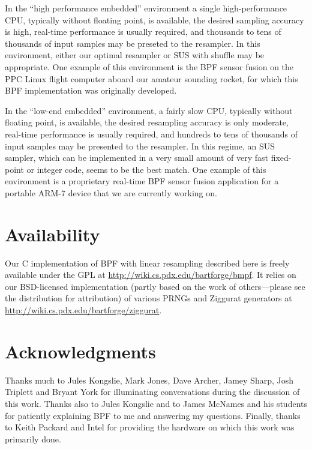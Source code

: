 \documentclass[12pt]{article}
\begin{document}
  In the ``high performance embedded'' environment a single
  high-performance CPU, typically without floating point, is
  available, the desired sampling accuracy is high,
  real-time performance is usually required, and thousands
  to tens of thousands of input samples may be preseted to
  the resampler.  In this environment, either our optimal
  resampler or SUS with shuffle may be appropriate.  One
  example of this environment is the BPF sensor fusion on
  the PPC Linux flight computer aboard our amateur sounding
  rocket, for which this BPF implementation was originally
  developed.

  In the ``low-end embedded'' environment, a fairly slow
  CPU, typically without floating point, is available, the
  desired resampling accuracy is only moderate, real-time
  performance is usually required, and hundreds to tens of
  thousands of input samples may be presented to the
  resampler.  In this regime, an SUS sampler, which can be
  implemented in a very small amount of very fast
  fixed-point or integer code, seems to be the best match.
  One example of this environment is a proprietary real-time
  BPF sensor fusion application for a portable ARM-7 device
  that we are currently working on.

\section*{Availability}

  Our C implementation of BPF with linear resampling
  described here is freely available under the GPL at
  \url{http://wiki.cs.pdx.edu/bartforge/bmpf}.  It relies on
  our BSD-licensed implementation (partly based on the work
  of others---please see the distribution for attribution)
  of various PRNGs and Ziggurat generators at
  \url{http://wiki.cs.pdx.edu/bartforge/ziggurat}.

\section*{Acknowledgments}

  Thanks much to Jules Kongslie, Mark Jones, Dave Archer,
  Jamey Sharp, Josh Triplett and Bryant York for
  illuminating conversations during the discussion of this
  work.  Thanks also to Jules Kongslie and to James McNames
  and his students for patiently explaining BPF to me and
  answering my questions.  Finally, thanks to Keith Packard
  and Intel for providing the hardware on which this work
  was primarily done.



\end{document}
